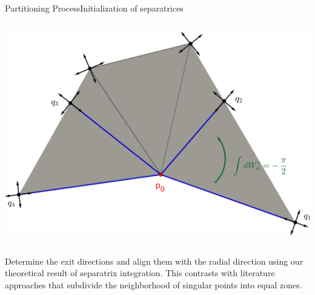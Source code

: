 \documentclass[compress,10pt,aspectratio=169]{beamer}
\begin{document}
\begin{frame}{Partitioning Process}{Initialization of separatrices}
\begin{columns}
\begin{column}{0.4\textwidth}
\centering
\includegraphics[scale=0.3]{images/triangle separatrices bord.png}
\end{column}
\end{columns}
Determine the exit directions and align them with the radial direction using our theoretical result of separatrix integration. This contrasts with literature approaches that subdivide the neighborhood of singular points into equal zones.

\end{frame}
\end{document}
